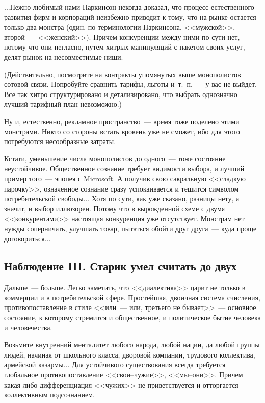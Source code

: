 \documentclass{scrbook}
\newcommand{\flqq}{<<}
\newcommand{\frqq}{>>}
\newcommand{\mdash}{~--- }
\newcommand{\ndash}{--}
\newcommand{\essaysection}[1]{\subsection*{#1}\nopagebreak}
\begin{document}
...Нежно любимый нами Паркинсон некогда доказал, что процесс естественного развития фирм и корпораций неизбежно приводит к тому, что на рынке остается только два монстра (один, по терминологии Паркинсона, {\flqq}мужской{\frqq}, второй{\mdash}{\flqq}женский{\frqq}). Причем конкуренции между ними по сути нет, потому что они негласно, путем хитрых манипуляций с пакетом своих услуг, делят рынок на несовместимые ниши.

(Действительно, посмотрите на контракты упомянутых выше монополистов сотовой связи. Попробуйте сравнить тарифы, льготы и~т.~п.{\mdash} у вас не выйдет. Все так хитро структурировано и детализировано, что выбрать однозначно лучший тарифный план невозможно.)

Ну и, естественно, рекламное пространство{\mdash}время тоже поделено этими монстрами. Никто со стороны встать вровень уже не сможет, ибо для этого потребуются несообразные затраты.

Кстати, уменьшение числа монополистов до одного{\mdash}тоже состояние неустойчивое. Общественное сознание требует видимости выбора, и лучший пример того{\mdash}эпопея с Microsoft. А получив свою сакральную {\flqq}сладкую парочку{\frqq}, означенное сознание сразу успокаивается и тешится символом потребительской свободы... Хотя по сути, как уже сказано, разницы нету, а значит, и выбор иллюзорен. Потому что в вырожденной схеме с двумя {\flqq}конкурентами{\frqq} настоящая конкуренция уже отсутствует. Монстрам нет нужды соперничать, улучшать товар, пытаться обойти друг друга{\mdash}куда проще договориться...

\essaysection{Наблюдение III. Старик умел считать до двух}

Дальше{\mdash}больше. Легко заметить, что {\flqq}диалектика{\frqq} царит не только в коммерции и в потребительской сфере. Простейшая, двоичная система счисления, противопоставление в стиле {\flqq}или{\mdash}или, третьего не бывает{\frqq}{\mdash}основное состояние, к которому стремится и общественное, и политическое бытие человека и человечества.

Возьмите внутренний менталитет любого народа, любой нации, да любой группы людей, начиная от школьного класса, дворовой компании, трудового коллектива, армейской казармы... Для устойчивого существования всегда требуется глобальное противопоставление {\flqq}свои{\ndash}чужие{\frqq}, {\flqq}мы{\ndash}они{\frqq}. Причем какая-либо дифференциация {\flqq}чужих{\frqq} не приветствуется и отторгается коллективным подсознанием.
\end{document}
